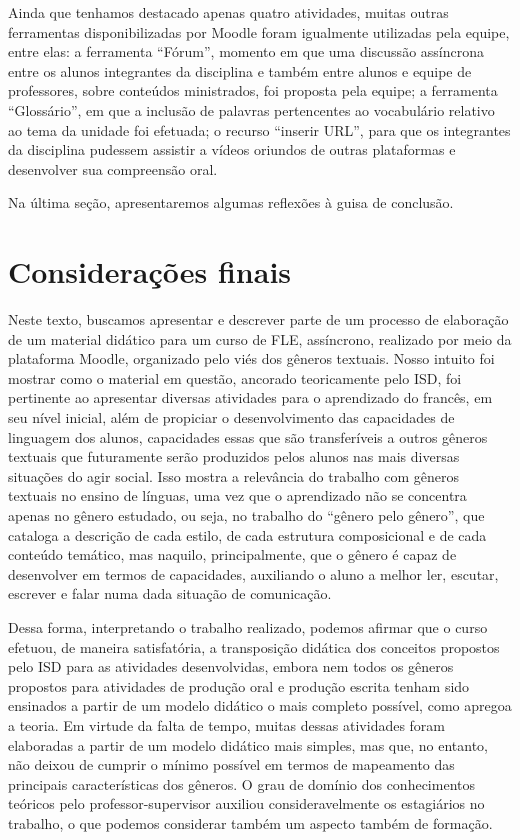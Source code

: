 Ainda que tenhamos destacado apenas quatro atividades, muitas outras
ferramentas disponibilizadas por Moodle foram igualmente utilizadas pela
equipe, entre elas: a ferramenta \enquote{Fórum}, momento em que uma discussão
assíncrona entre os alunos integrantes da disciplina e também entre
alunos e equipe de professores, sobre conteúdos ministrados, foi
proposta pela equipe; a ferramenta \enquote{Glossário}, em que a inclusão de
palavras pertencentes ao vocabulário relativo ao tema da unidade foi
efetuada; o recurso \enquote{inserir URL}, para que os integrantes da
disciplina pudessem assistir a vídeos oriundos de outras plataformas e
desenvolver sua compreensão oral.

Na última seção, apresentaremos algumas reflexões à guisa de conclusão.

\section{Considerações finais}

Neste texto, buscamos apresentar e descrever parte de um processo de elaboração de um material didático para um curso de FLE, assíncrono, realizado por meio da plataforma Moodle, organizado pelo viés dos gêneros textuais. Nosso intuito foi mostrar como o material em questão, ancorado teoricamente pelo ISD, foi pertinente ao apresentar diversas atividades para o aprendizado do francês, em seu nível inicial, além de propiciar o desenvolvimento das capacidades de linguagem dos alunos, capacidades essas que são transferíveis a outros gêneros textuais que futuramente serão produzidos pelos alunos nas mais diversas situações do agir social. Isso mostra a relevância do trabalho com gêneros textuais no ensino de línguas, uma vez que o aprendizado não se concentra apenas no gênero estudado, ou seja, no trabalho do “gênero pelo gênero”, que cataloga a descrição de cada estilo, de cada estrutura composicional e de cada conteúdo temático, mas naquilo, principalmente, que o gênero é capaz de desenvolver em termos de capacidades, auxiliando o aluno a melhor ler, escutar, escrever e falar numa dada situação de comunicação.

Dessa forma, interpretando o trabalho realizado, podemos afirmar que o curso efetuou, de maneira satisfatória, a transposição didática dos conceitos propostos pelo ISD para as atividades desenvolvidas, embora nem todos os gêneros propostos para atividades de produção oral e produção escrita tenham sido ensinados a partir de um modelo didático o mais completo possível, como apregoa a teoria. Em virtude da falta de tempo, muitas dessas atividades foram elaboradas a partir de um modelo didático mais simples, mas que, no entanto, não deixou de cumprir o mínimo possível em termos de mapeamento das principais características dos gêneros. O grau de domínio dos conhecimentos teóricos pelo professor-supervisor auxiliou consideravelmente os estagiários no trabalho, o que podemos considerar também um aspecto também de formação.

